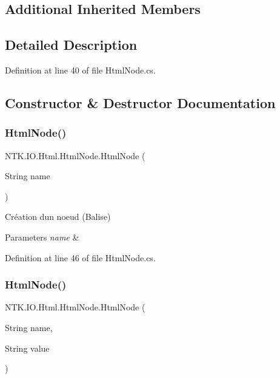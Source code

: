 \subsection*{Additional Inherited Members}


\subsection{Detailed Description}




Definition at line 40 of file Html\+Node.\+cs.



\subsection{Constructor \& Destructor Documentation}
\mbox{\label{class_n_t_k_1_1_i_o_1_1_html_1_1_html_node_aebba3d90436a2952571b8660e3bed858}} 
\subsubsection{\texorpdfstring{HtmlNode()}{HtmlNode()}\hspace{0.1cm}{\footnotesize\ttfamily [1/3]}}
{\footnotesize\ttfamily N\+T\+K.\+I\+O.\+Html.\+Html\+Node.\+Html\+Node (\begin{DoxyParamCaption}\item[{String}]{name }\end{DoxyParamCaption})}



Création d\textquotesingle{}un noeud (Balise) 


\begin{DoxyParams}{Parameters}
{\em name} & \\
\hline
\end{DoxyParams}


Definition at line 46 of file Html\+Node.\+cs.

\mbox{\label{class_n_t_k_1_1_i_o_1_1_html_1_1_html_node_aa66ba6aa4b13a509f78d82b47eab7062}} 
\subsubsection{\texorpdfstring{HtmlNode()}{HtmlNode()}\hspace{0.1cm}{\footnotesize\ttfamily [2/3]}}
{\footnotesize\ttfamily N\+T\+K.\+I\+O.\+Html.\+Html\+Node.\+Html\+Node (\begin{DoxyParamCaption}\item[{String}]{name,  }\item[{String}]{value }\end{DoxyParamCaption})}




